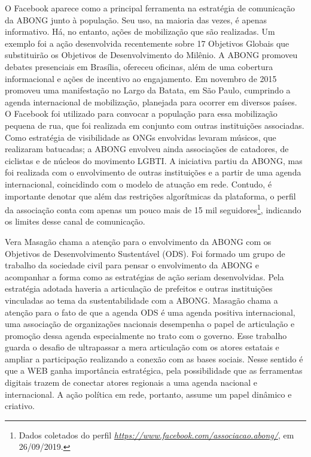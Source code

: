 O Facebook aparece como a principal ferramenta na estratégia de
comunicação da ABONG junto à população. Seu uso, na maioria das vezes, é
apenas informativo. Há, no entanto, ações de mobilização que são
realizadas. Um exemplo foi a ação desenvolvida recentemente sobre 17
Objetivos Globais que substituirão os Objetivos de Desenvolvimento do
Milênio. A ABONG promoveu debates presenciais em Brasília, ofereceu
oficinas, além de uma cobertura informacional e ações de incentivo ao
engajamento. Em novembro de 2015 promoveu uma manifestação no Largo da
Batata, em São Paulo, cumprindo a agenda internacional de mobilização,
planejada para ocorrer em diversos países. O Facebook foi utilizado para
convocar a população para essa mobilização pequena de rua, que foi
realizada em conjunto com outras instituições associadas. Como
estratégia de visibilidade as ONGs envolvidas levaram músicos, que
realizaram batucadas; a ABONG envolveu ainda associações de catadores,
de ciclistas e de núcleos do movimento LGBTI. A iniciativa partiu da
ABONG, mas foi realizada com o envolvimento de outras instituições e a
partir de uma agenda internacional, coincidindo com o modelo de atuação
em rede. Contudo, é importante denotar que além das restrições
algorítmicas da plataforma, o perfil da associação conta com apenas um
pouco mais de 15 mil seguidores\footnote{Dados coletados do perfil
  \href{https://www.facebook.com/associacao.abong/}{\emph{https://www.facebook.com/associacao.abong/}},
  em 26/09/2019.}, indicando os limites desse canal de comunicação.

Vera Masagão chama a atenção para o envolvimento da ABONG com os
Objetivos de Desenvolvimento Sustentável (ODS). Foi formado um grupo de
trabalho da sociedade civil para pensar o envolvimento da ABONG e
acompanhar a forma como as estratégias de ação seriam desenvolvidas.
Pela estratégia adotada haveria a articulação de prefeitos e outras
instituições vinculadas ao tema da sustentabilidade com a ABONG. Masagão
chama a atenção para o fato de que a agenda ODS é uma agenda positiva
internacional, uma associação de organizações nacionais desempenha o
papel de articulação e promoção dessa agenda especialmente no trato com
o governo. Esse trabalho guarda o desafio de ultrapassar a mera
articulação com os atores estatais e ampliar a participação realizando a
conexão com as bases sociais. Nesse sentido é que a WEB ganha
importância estratégica, pela possibilidade que as ferramentas digitais
trazem de conectar atores regionais a uma agenda nacional e
internacional. A ação política em rede, portanto, assume um papel
dinâmico e criativo.

